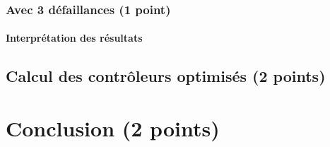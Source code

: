 \documentclass[a4paper]{book}
\begin{document}
\subsubsection{Avec 3 défaillances (1 point)}


%
%
%
\paragraph{Interprétation des résultats}

\subsection{Calcul des contrôleurs optimisés (2 points)}

\section{Conclusion (2 points)}
\end{document}
